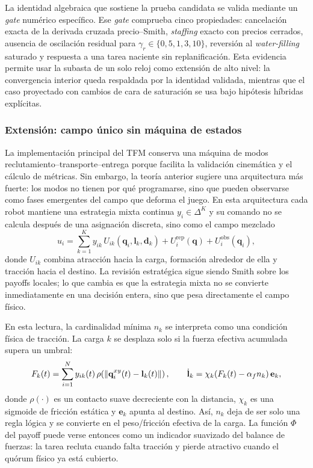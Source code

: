 La identidad algebraica que sostiene la prueba candidata se valida mediante un
\emph{gate} numérico específico. Ese \emph{gate} comprueba cinco propiedades:
cancelación exacta de la derivada cruzada precio--Smith, \emph{staffing} exacto con
precios cerrados, ausencia de oscilación residual para
$\gamma_r\in\{0{,}5,1,3,10\}$, reversión al \emph{water-filling} saturado y respuesta a
una tarea naciente sin replanificación. Esta evidencia permite usar la subasta de un
solo reloj como extensión de alto nivel: la convergencia interior queda respaldada por la
identidad validada, mientras que el caso proyectado con cambios de cara de saturación se
usa bajo hipótesis híbridas explícitas.

\subsubsection{Extensión: campo único sin máquina de estados}
\label{subsubsec:campo_unico}

La implementación principal del TFM conserva una máquina de modos
reclutamiento--transporte--entrega porque facilita la validación cinemática y el cálculo
de métricas. Sin embargo, la teoría anterior sugiere una arquitectura más fuerte: los
modos no tienen por qué programarse, sino que pueden observarse como fases emergentes
del campo que deforma el juego. En esta arquitectura cada robot mantiene una estrategia
mixta continua $y_i\in\Delta^{K}$ y su comando no se calcula después de una asignación
discreta, sino como el campo mezclado
\begin{equation}
  u_i =
  \sum_{k=1}^{K} y_{ik}\,U_{ik}(\mathbf{q}_i,\mathbf{l}_k,\mathbf{d}_k)
  + U_i^{\mathrm{rep}}(\mathbf{q})
  + U_i^{\mathrm{obs}}(\mathbf{q}_i),
  \label{eq:campo_unico}
\end{equation}
donde $U_{ik}$ combina atracción hacia la carga, formación alrededor de ella y tracción
hacia el destino. La revisión estratégica sigue siendo Smith sobre los payoffs locales;
lo que cambia es que la estrategia mixta no se convierte inmediatamente en una decisión
entera, sino que pesa directamente el campo físico.

En esta lectura, la cardinalidad mínima $n_k$ se interpreta como una condición física de
tracción. La carga $k$ se desplaza solo si la fuerza efectiva acumulada supera un umbral:
\begin{equation}
  F_k(t)=\sum_{i=1}^{N} y_{ik}(t)\,
  \rho\!\left(\left\|\mathbf{q}_i^{xy}(t)-\mathbf{l}_k(t)\right\|\right),
  \qquad
  \dot{\mathbf{l}}_k =
  \chi_k\!\left(F_k(t)-\alpha_f n_k\right)
  \mathbf{e}_k,
  \label{eq:campo_unico_carga}
\end{equation}
donde $\rho(\cdot)$ es un contacto suave decreciente con la distancia,
$\chi_k$ es una sigmoide de fricción estática y $\mathbf{e}_k$ apunta al destino. Así,
$n_k$ deja de ser solo una regla lógica y se convierte en el peso/fricción efectiva de
la carga. La función $\Phi$ del payoff puede verse entonces como un indicador suavizado
del balance de fuerzas: la tarea recluta cuando falta tracción y pierde atractivo cuando
el quórum físico ya está cubierto.

